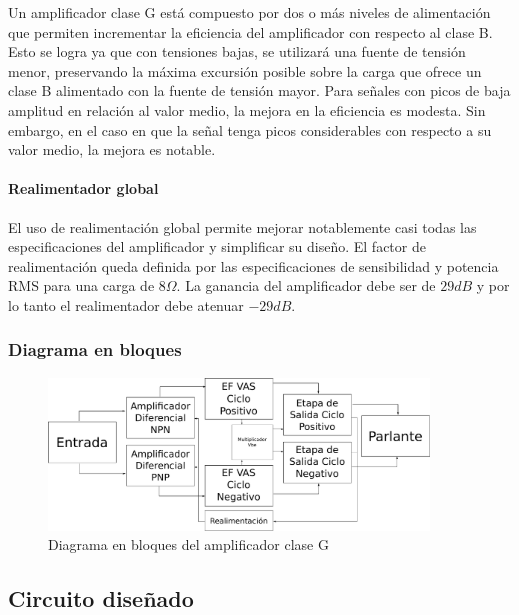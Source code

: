 \documentclass[a4paper,12pt,twoside]{article}
\begin{document}
Un amplificador clase G está compuesto por dos o más niveles de alimentación que permiten incrementar la eficiencia del amplificador con respecto al clase B. Esto se logra ya que con tensiones bajas, se utilizará una fuente de tensión menor, preservando la máxima excursión posible sobre la carga que ofrece un clase B alimentado con la fuente de tensión mayor. Para señales con picos de baja amplitud en relación al valor medio, la mejora en la eficiencia es modesta. Sin embargo, en el caso en que la señal tenga picos considerables con respecto a su valor medio, la mejora es notable.

\paragraph{Realimentador global}

El uso de realimentación global permite mejorar notablemente casi todas las especificaciones del amplificador y simplificar su diseño. El factor de realimentación queda definida por las especificaciones de sensibilidad y potencia RMS para una carga de $8\Omega$. La ganancia del amplificador debe ser de $29dB$ y por lo tanto el realimentador debe atenuar $-29dB$.



\subsubsection{Diagrama en bloques}



\begin{figure}[H]
	\centering
	\includegraphics[width=0.9\textwidth]{img/bloques}
	\caption{Diagrama en bloques del amplificador clase G}
	\label{fig:ampli_bloques}
\end{figure}

\newpage


\subsection{Circuito diseñado}
\end{document}
